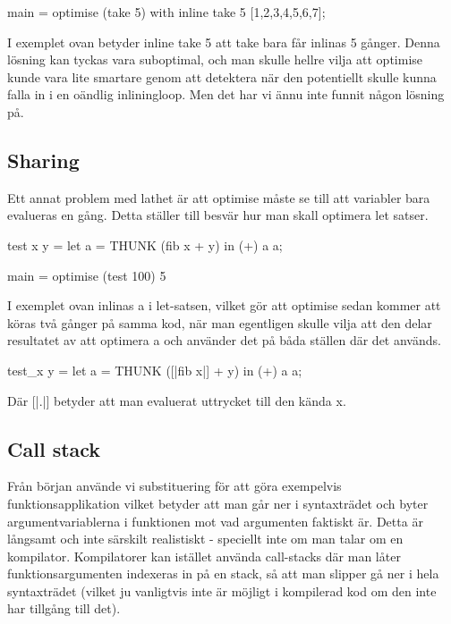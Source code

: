 \documentclass[Rapport]{subfiles}
\begin{document}
\begin{codeEx}
main = optimise (take 5) with { inline take 5 } [1,2,3,4,5,6,7];
\end{codeEx}

I exemplet ovan betyder inline take 5 att take bara får inlinas 5 gånger.
Denna lösning kan tyckas vara suboptimal, och man skulle hellre vilja att optimise
kunde vara lite smartare genom att detektera när den potentiellt skulle kunna
falla in i en oändlig inliningloop. Men det har vi ännu inte funnit
någon lösning på.

\subsection{Sharing}
Ett annat problem med lathet är att optimise måste se till att variabler bara 
evalueras en gång. Detta ställer till besvär hur man skall optimera let satser.

\begin{codeEx}
test x y = let
    { a = THUNK (fib x + y)
    } in (+) a a;

main = optimise (test 100) 5
\end{codeEx}

I exemplet ovan inlinas a i let-satsen, vilket gör att optimise sedan kommer att
köras två gånger på samma kod, när man egentligen skulle vilja att den delar resultatet
av att optimera a och använder det på båda ställen där det används.

\begin{codeEx}
test_x y = let
    { a = THUNK ([|fib x|] + y)
    } in (+) a a;
\end{codeEx}
Där [|.|] betyder att man evaluerat uttrycket till den kända x. 

\subsection{Call stack}

Från början använde vi substituering för att göra exempelvis funktionsapplikation
vilket betyder att man går ner i syntaxträdet och byter argumentvariablerna i funktionen
mot vad argumenten faktiskt är. Detta är långsamt och inte särskilt realistiskt - 
speciellt inte om man talar om en kompilator. Kompilatorer kan istället använda call-stacks
där man låter funktionsargumenten indexeras in på en stack, så att man slipper
gå ner i hela syntaxträdet (vilket ju vanligtvis inte är möjligt i kompilerad kod 
om den inte har tillgång till det).
\end{document}
